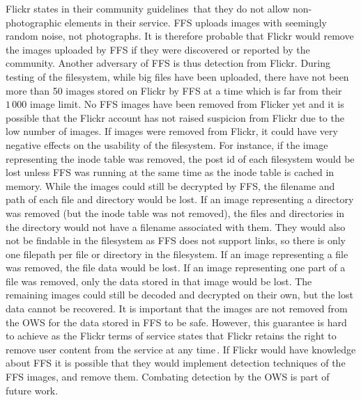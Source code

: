 Flickr states in their community guidelines\,\cite{flickrinc.FlickrCommunityGuidelines2022} that they do not allow non-photographic elements in their service. \gls{FFS} uploads images with seemingly random noise, not photographs. It is therefore probable that Flickr would remove the images uploaded by \gls{FFS} if they were discovered or reported by the community. Another adversary of \gls{FFS} is thus detection from Flickr. During testing of the filesystem, while big files have been uploaded, there have not been more than 50 images stored on Flickr by \gls{FFS} at a time which is far from their $1\,000$ image limit. No \gls{FFS} images have been removed from Flicker yet and it is possible that the Flickr account has not raised suspicion from Flickr due to the low number of images. If images were removed from Flickr, it could have very negative effects on the usability of the filesystem. For instance, if the image representing the inode table was removed, the post id of each filesystem would be lost unless \gls{FFS} was running at the same time as the inode table is cached in memory. While the images could still be decrypted by \gls{FFS}, the filename and path of each file and directory would be lost. If an image representing a directory was removed (but the inode table was not removed), the files and directories in the directory would not have a filename associated with them. They would also not be findable in the filesystem as \gls{FFS} does not support links, so there is only one filepath per file or directory in the filesystem. If an image representing a file was removed, the file data would be lost. If an image representing one part of a file was removed, only the data stored in that image would be lost. The remaining images could still be decoded and decrypted on their own, but the lost data cannot be recovered. It is important that the images are not removed from the \gls{OWS} for the data stored in \gls{FFS} to be safe. However, this guarantee is hard to achieve as the Flickr terms of service states that Flickr retains the right to remove user content from the service at any time\,\cite{flickrinc.FlickrTermsConditions2020}. If Flickr would have knowledge about \gls{FFS} it is possible that they would implement detection techniques of the \gls{FFS} images, and remove them. Combating detection by the \gls{OWS} is part of future work.

